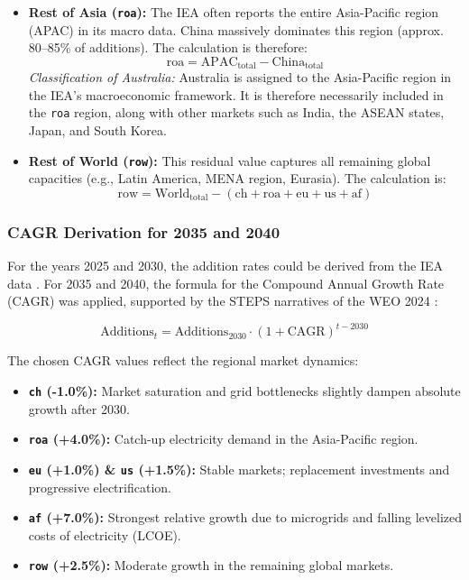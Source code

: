 \documentclass[11pt,a4paper]{article}
\begin{document}
\begin{itemize}
    \item \textbf{Rest of Asia (\texttt{roa}):} The IEA often reports the entire Asia-Pacific region (APAC) in its macro data. China massively dominates this region (approx. 80--85\% of additions). The calculation is therefore: 
    \begin{equation}
    \text{roa} = \text{APAC}_{\text{total}} - \text{China}_{\text{total}}
    \end{equation}
    \textit{Classification of Australia:} Australia is assigned to the Asia-Pacific region in the IEA's macroeconomic framework. It is therefore necessarily included in the \texttt{roa} region, along with other markets such as India, the ASEAN states, Japan, and South Korea.
    
    \item \textbf{Rest of World (\texttt{row}):} This residual value captures all remaining global capacities (e.g., Latin America, MENA region, Eurasia). The calculation is:
    \begin{equation}
    \text{row} = \text{World}_{\text{total}} - (\text{ch} + \text{roa} + \text{eu} + \text{us} + \text{af})
    \end{equation}
\end{itemize}

\subsubsection{CAGR Derivation for 2035 and 2040}
For the years 2025 and 2030, the addition rates could be derived from the IEA data \cite{iea_renewables_2025}. For 2035 and 2040, the formula for the Compound Annual Growth Rate (CAGR) was applied, supported by the STEPS narratives of the WEO 2024 \cite{iea_weo_2024}:

\begin{equation}
\text{Additions}_t = \text{Additions}_{2030} \cdot (1 + \text{CAGR})^{t - 2030}
\end{equation}

The chosen CAGR values reflect the regional market dynamics:
\begin{itemize}
    \item \textbf{\texttt{ch} (-1.0\%):} Market saturation and grid bottlenecks slightly dampen absolute growth after 2030.
    \item \textbf{\texttt{roa} (+4.0\%):} Catch-up electricity demand in the Asia-Pacific region.
    \item \textbf{\texttt{eu} (+1.0\%) \& \texttt{us} (+1.5\%):} Stable markets; replacement investments and progressive electrification.
    \item \textbf{\texttt{af} (+7.0\%):} Strongest relative growth due to microgrids and falling levelized costs of electricity (LCOE).
    \item \textbf{\texttt{row} (+2.5\%):} Moderate growth in the remaining global markets.
\end{itemize}
\end{document}
